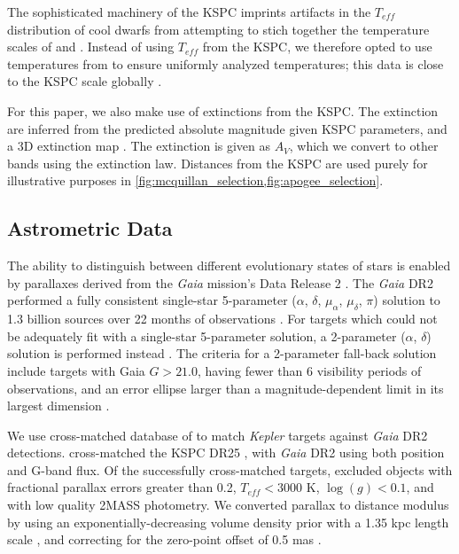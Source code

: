 \documentclass[manuscript]{aastex6}
\newcommand{\Kepler}{\mbox{\textit{Kepler}}}
\newcommand{\Gaia}{\mbox{\textit{Gaia}}}
\newcommand{\Teff}{\ensuremath{T_{eff}}}
\newcommand{\logg}{\ensuremath{\log(g)}}
\newcommand{\gvs}{\authorcomment1}
\begin{document}
The sophisticated machinery of the KSPC imprints artifacts in the \Teff{}
distribution of cool dwarfs from attempting to stich together the temperature
scales of \citet{Pinsonneault12} and \citet{Dressing13}. Instead of using
\Teff{} from the KSPC, we therefore opted to use temperatures from 
\citet{Pinsonneault12} to ensure uniformly analyzed temperatures; this data is
close to the KSPC scale globally \citep{Huber17}.

For this paper, we also make use of extinctions from the KSPC\@. The extinction 
are inferred from the predicted absolute magnitude given KSPC parameters, and
a 3D extinction map \citep{Amores05}. The extinction is given as \(A_V\), which we
convert to other bands using the \citep{Cardelli89} extinction law. Distances
from the KSPC are used purely for illustrative purposes in
\cref{fig:mcquillan_selection,fig:apogee_selection}.

\subsection{Astrometric Data}

The ability to distinguish between different evolutionary states of stars is
enabled by parallaxes derived from the \Gaia{} mission's Data Release 2
\citep{Gaia18}. The \Gaia{} DR2 performed a fully consistent single-star
5-parameter (\(\alpha\), \(\delta\), \(\mu_\alpha\), \(\mu_\delta\), \(\pi\))
solution to 1.3 billion sources over 22 months of observations
\citep{Lindegren18}. For targets which could not be adequately fit with a
single-star 5-parameter solution, a 2-parameter (\(\alpha\), \(\delta\))
solution is performed instead \citep{Michalik15}. The criteria for a
2-parameter fall-back solution include targets with Gaia \(G > 21.0\), having
fewer than 6 visibility periods of observations, and an error ellipse larger
than a magnitude-dependent limit in its largest dimension \citep{Lindegren18}.


We use  cross-matched database of \citet{Berger18b} to match \Kepler{} targets
against \Gaia{} DR2 detections.
\citet{Berger18b} cross-matched the KSPC DR25 \citep{Mathur17}, with \Gaia{} 
DR2 using both position and G-band flux. Of the successfully cross-matched targets,
\citet{Berger18b} excluded objects with fractional parallax errors greater than
0.2, \(\Teff < 3000\) K, \(\logg < 0.1\), and with low quality 2MASS photometry. 
We converted parallax to distance modulus by using an
exponentially-decreasing volume density prior with a 1.35 kpc length scale
\citep{BailerJones15,Astraatmadja16}, and correcting for the zero-point offset
of 0.5 mas \citep{Zinn18}. \gvs{Should we include a table of this?} 
\end{document}
